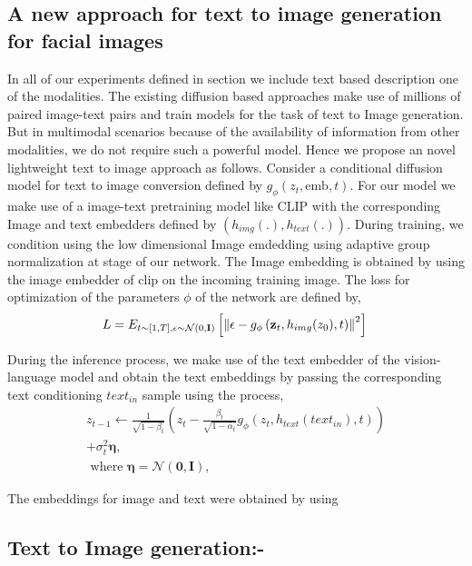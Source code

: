\documentclass[10pt,twocolumn,letterpaper]{article}
\begin{document}
\subsection{A new approach for text to image generation for facial images}
In all of our experiments defined in section we include text based description one of the modalities. The existing diffusion based approaches make use of millions of paired image-text pairs and train models for the task of text to Image generation. But in multimodal scenarios because of the availability of information from other modalities, we do not require such a powerful model. Hence we propose an novel lightweight text to image approach as follows. Consider a conditional diffusion model for text to image conversion defined by $g_{\phi}(z_t,\text{emb},t)$. For our model we make use of a image-text pretraining model like CLIP with the corresponding Image and text embedders  defined by $(h_{img}(.),h_{text}(.))$. During training, we condition using the low dimensional Image emdedding using adaptive  group normalization at stage of our network. The Image embedding is obtained by using the image embedder of clip on the incoming training image. The loss for optimization of the parameters $\phi$ of the network are defined by,
\begin{equation}
 L =E_{t \sim[1, T], \epsilon \sim \mathcal{N}(0, \mathbf{I})}\left[\left\|\epsilon-g_{\phi}\left(\mathbf{z}_t,h_{img}(z_0), t\right)\right\|^{2}\right]\\
\end{equation}

During the inference process, we make use of the text embedder of the vision-language model and obtain the text embeddings by passing the corresponding text conditioning $text_{in}$  sample using the process,
\begin{align*}
        z_{t-1} \leftarrow{} \frac{1}{\sqrt{1-\beta_t}} \left( z_t - \frac{ \beta_t}{\sqrt{1-\bar{\alpha}_t}}g_{\phi}(z_t,h_{text}(text_{in}), t) \right) \\ + \sigma_t^2 \boldsymbol{\eta}, \\
    \text{ where } \boldsymbol{\eta} = \mathcal{N}(\boldsymbol{0}, \boldsymbol{I}),
    \label{eq:cond_samp}
\end{align*}

The embeddings for image and text were obtained by using \cite{zheng2021farl}



\subsection{Text to Image generation:-}
\end{document}
